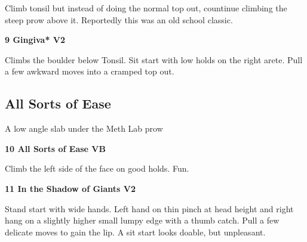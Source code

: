 \begin{multicols}{2}
\begin{adjustwidth}{0.5cm}{}
\begin{minipage}{\linewidth}
							\begin{adjustwidth}{0.5cm}{}				
							Climb tonsil but instead of doing the normal top out, countinue climbing the steep prow above it. Reportedly this was an old school classic.
							\end{adjustwidth}
							\end{minipage}
						\end{adjustwidth}
					\begin{minipage}{\linewidth}	
					\label{rt:Gingiva}
\colorbox{green!20}{
\parbox{0.95\textwidth}{
\textbf{
9 Gingiva* V2   
}
}
}

					\begin{adjustwidth}{0.5cm}{}				
					Climbs the boulder below Tonsil. Sit start with low holds on the right arete. Pull a few awkward moves into a cramped top out.
					\end{adjustwidth}
					\end{minipage}
			\begin{minipage}{\columnwidth}
			\subsection*{All Sorts of Ease}\label{bf:All Sorts of Ease}
			A low angle slab under the Meth Lab prow
			
			\end{minipage}
			
					\begin{minipage}{\linewidth}	
					\label{rt:All Sorts of Ease}
\colorbox{green!20}{
\parbox{0.95\textwidth}{
\textbf{
10 All Sorts of Ease VB    
}
}
}

					\begin{adjustwidth}{0.5cm}{}				
					Climb the left side of the face on good holds. Fun.
					\end{adjustwidth}
					\end{minipage}
					\begin{minipage}{\linewidth}	
					\label{rt:In the Shadow of Giants}
\colorbox{green!20}{
\parbox{0.95\textwidth}{
\textbf{
11 In the Shadow of Giants V2   
}
}
}

					\begin{adjustwidth}{0.5cm}{}				
					Stand start with wide hands. Left hand on thin pinch at head height and right hang on a slightly higher small lumpy edge with a thumb catch. Pull a few delicate moves to gain the lip. A sit start looks doable, but unpleasant.
					\end{adjustwidth}
					\end{minipage}
			\begin{minipage}{\columnwidth}

\end{minipage}
\end{multicols}
